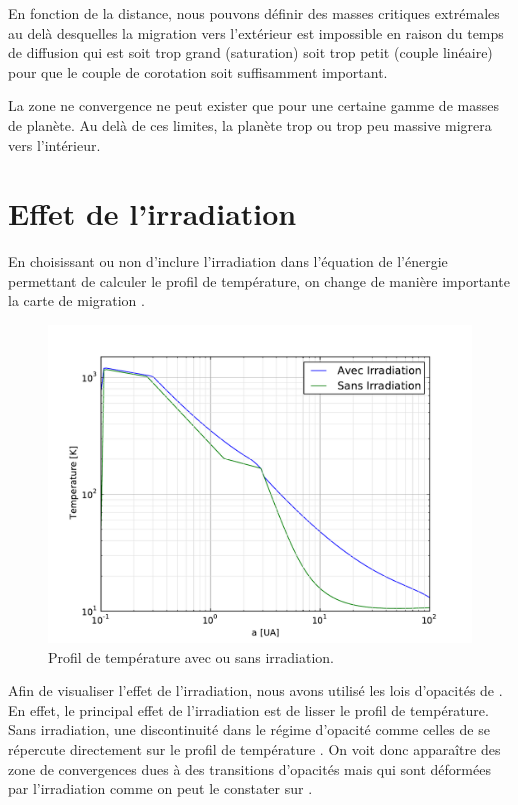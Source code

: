 En fonction de la distance, nous pouvons définir des masses critiques extrémales au delà desquelles la migration vers
l'extérieur est impossible en raison du temps de diffusion qui est soit trop grand (saturation) soit trop petit (couple
linéaire) pour que le couple de corotation soit suffisamment important.

La zone ne convergence ne peut exister que pour une certaine gamme de masses de planète. Au delà de ces limites, la planète trop ou trop peu massive migrera vers l'intérieur.

\section{Effet de l'irradiation}
En choisissant ou non d'inclure l'irradiation dans l'équation de l'énergie permettant de calculer le profil de température, on
change de manière importante la carte de migration \citep{bitsch2013stellar}. 

\begin{figure}[htbp]
\centering
\includegraphics[width=0.6\linewidth]{figure/migration_map/temperature_with_irradiation.pdf}
\caption[Profil de température avec ou sans irradiation.]{Profil de température avec ou sans irradiation.
}\label{fig:temp_profile_irradiation}
\end{figure}


Afin de visualiser l'effet de l'irradiation, nous avons utilisé les lois d'opacités de \cite{bell1994FU}. En effet,
le principal effet de l'irradiation est de lisser le profil de température. Sans irradiation, une discontinuité dans le régime d'opacité comme celles de \cite{bell1994FU} se répercute directement sur le profil de température .
On voit donc apparaître des zone de convergences dues à des transitions d'opacités mais qui sont déformées par
l'irradiation comme on peut le constater sur .

